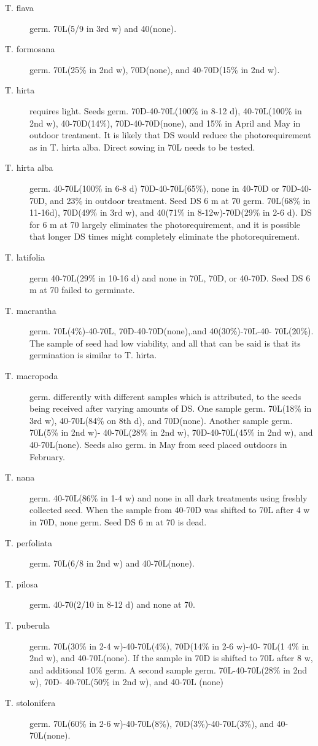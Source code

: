 \begin{description}
\item[T. flava] germ. 70L(5/9 in 3rd w) and 40(none).
\item[T. formosana] germ. 70L(25\% in 2nd w), 70D(none), and 40-70D(15\% in 2nd w).
\item[T. hirta] requires light. Seeds germ. 70D-40-70L(100\% in 8-12 d), 40-70L(100\%
in 2nd w), 40-70D(14\%), 70D-40-70D(none), and 15\% in April and May in outdoor
treatment. It is likely that DS would reduce the photorequirement as in T. hirta alba.
Direct sowing in 70L needs to be tested.

\item[T. hirta alba] germ. 40-70L(100\% in 6-8 d) 70D-40-70L(65\%), none in 40-70D
or 70D-40-70D, and 23\% in outdoor treatment. Seed DS 6 m at 70 germ. 70L(68\% in
11-16d), 70D(49\% in 3rd w), and 40(71\% in 8-12w)-70D(29\% in 2-6 d). DS for 6 m at
70 largely eliminates the photorequirement, and it is possible that longer DS times
might completely eliminate the photorequirement.
\item[T. latifolia] germ 40-70L(29\% in 10-16 d) and none in 70L, 70D, or 40-70D.
Seed DS 6 m at 70 failed to germinate.
\item[T. macrantha] germ. 70L(4\%)-40-70L, 70D-40-70D(none),.and 40(30\%)-70L-40-
70L(20\%). The sample of seed had low viability, and all that can be said is that its
germination is similar to T. hirta.
\item[T. macropoda] germ. differently with different samples which is attributed, to the
seeds being received after varying amounts of DS. One sample germ. 70L(18\% in 3rd
w), 40-70L(84\% on 8th d), and 70D(none). Another sample germ. 70L(5\% in 2nd w)-
40-70L(28\% in 2nd w), 70D-40-70L(45\% in 2nd w), and 40-70L(none). Seeds also
germ. in May from seed placed outdoors in February.
\item[T. nana] germ. 40-70L(86\% in 1-4 w) and none in all dark treatments using
freshly collected seed. When the sample from 40-70D was shifted to 70L after 4 w in
70D, none germ. Seed DS 6 m at 70 is dead.
\item[T. perfoliata] germ. 70L(6/8 in 2nd w) and 40-70L(none).
\item[T. pilosa] germ. 40-70(2/10 in 8-12 d) and none at 70.
\item[T. puberula] germ. 70L(30\% in 2-4 w)-40-70L(4\%), 70D(14\% in 2-6 w)-40-
70L(1 4\% in 2nd w), and 40-70L(none). If the sample in 70D is shifted to 70L after 8 w,
and additional 10\% germ. A second sample germ. 70L-40-70L(28\% in 2nd w), 70D-
40-70L(50\% in 2nd w), and 40-70L (none)
\item[T. stolonifera] germ. 70L(60\% in 2-6 w)-40-70L(8\%), 70D(3\%)-40-70L(3\%), and
40-70L(none).


\end{description}

